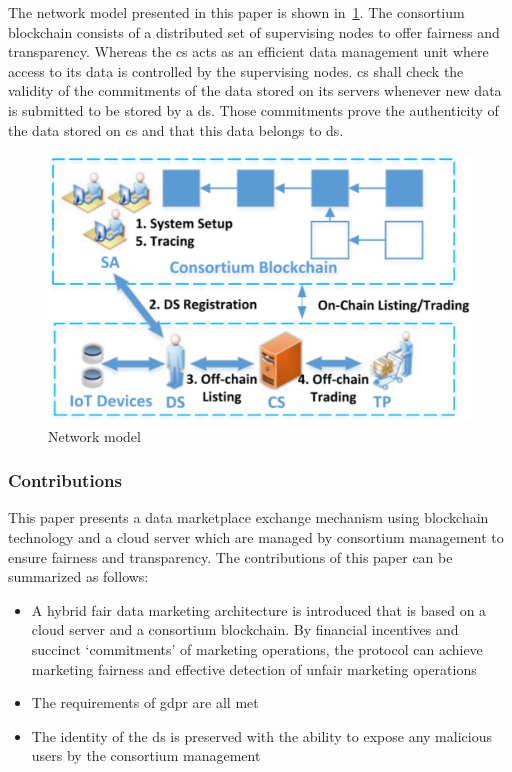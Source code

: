 The network model presented in this paper is shown in~\cref{fig:22-network-model}.
The consortium blockchain consists of a distributed set of supervising nodes to offer fairness and transparency.
Whereas the \ac{cs} acts as an efficient data management unit where access to its data is controlled by the supervising nodes.
\ac{cs} shall check the validity of the commitments of the data stored on its servers whenever new data is submitted to be stored by a \ac{ds}. 
Those commitments prove the authenticity of the data stored on \ac{cs} and that this data belongs to \ac{ds}.

\begin{figure}
\centering
  \includegraphics[width=0.9\linewidth]{imgs/22-network-model.eps}
  \caption{Network model~\cite{liu2022blockchain}}
  \label{fig:22-network-model}
\end{figure}

\subsubsection{Contributions}

This paper presents a data marketplace exchange mechanism using blockchain technology and a cloud server which are managed by consortium management to ensure fairness and transparency.
The contributions of this paper can be summarized as follows:

\begin{itemize}
    \item A hybrid fair data marketing architecture is introduced that is based on a cloud server and a consortium blockchain.
    By financial incentives and succinct ‘commitments’ of marketing operations, the protocol can achieve marketing fairness and effective detection of unfair marketing operations
    \item The requirements of \ac{gdpr} are all met
    \item The identity of the \ac{ds} is preserved with the ability to expose any malicious users by the consortium management 
\end{itemize}

